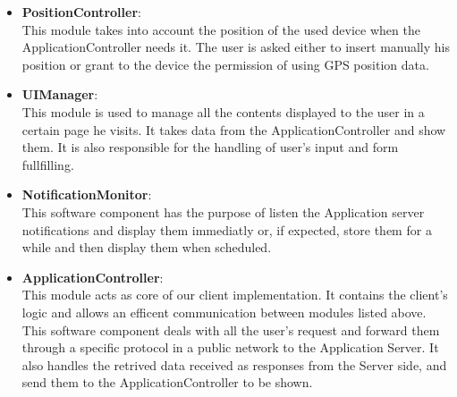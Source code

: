 \documentclass[numbers=noenddot, 12pt, a4paper, oneside]{scrbook}
\begin{document}
\begin{itemize}

	\item \textbf{PositionController}:\\\newline
	This module takes into account the position of the used device when the ApplicationController needs it. The user is asked either to insert manually his position or grant to the device the permission of using GPS position data.\\

	\item \textbf{UIManager}:\\\newline
	This module is used to manage all the contents displayed to the user in a certain page he visits. It takes data from the ApplicationController and show them. It is also responsible for the handling of user's input and form fullfilling.\\

	\item \textbf{NotificationMonitor}:\\\newline
	This software component has the purpose of listen the Application server notifications and display them immediatly or, if expected, store them for a while and then display them when scheduled.\\

	\item \textbf{ApplicationController}:\\\newline
	This module acts as core of our client implementation. It contains the client's logic and allows an efficent communication between modules listed above.\\

	This software component deals with all the user's request and forward them through a specific protocol in a public network to the Application Server.
	It also handles the retrived data received as responses from the Server side, and send them to the ApplicationController to be shown.\\

\end{itemize}
\end{document}

